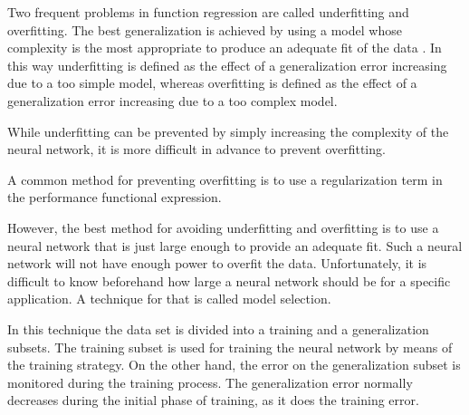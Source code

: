 Two frequent problems in function regression are called underfitting and overfitting. 
The best generalization is achieved by using a model whose complexity is the most appropriate to produce an adequate fit of the data \cite{Bishop1995}. 
In this way underfitting is defined as the effect of a generalization error increasing due to a too simple model, 
whereas overfitting is defined as the effect of a generalization error increasing due to a too complex model.





While underfitting can be prevented by simply increasing the complexity of the neural network, it is more difficult in advance to prevent overfitting.

A common method for preventing overfitting is to use a regularization term in the performance functional expression. 

However, the best method for avoiding underfitting and overfitting is to use a neural network that is just large enough to provide an adequate fit. 
Such a neural network will not have enough power to overfit the data. 
Unfortunately, it is difficult to know beforehand how large a neural network should be for a specific application.
A technique for that is called model selection. 

In this technique the data set is divided into a training and a generalization subsets. 
The training subset is used for training the neural network by means of the training strategy. 
On the other hand, the error on the generalization subset is monitored during the training process. 
The generalization error normally decreases during the initial phase of training, as it does the training error.

